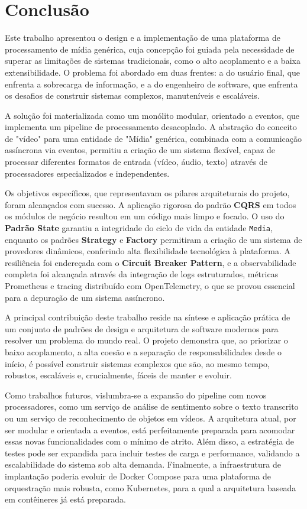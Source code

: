 \chapter{Conclusão}
\label{sec:conclusao}

Este trabalho apresentou o design e a implementação de uma plataforma de processamento de mídia genérica, cuja concepção foi guiada pela necessidade de superar as limitações de sistemas tradicionais, como o alto acoplamento e a baixa extensibilidade. O problema foi abordado em duas frentes: a do usuário final, que enfrenta a sobrecarga de informação, e a do engenheiro de software, que enfrenta os desafios de construir sistemas complexos, manuteníveis e escaláveis.

A solução foi materializada como um monólito modular, orientado a eventos, que implementa um pipeline de processamento desacoplado. A abstração do conceito de "vídeo" para uma entidade de "Mídia" genérica, combinada com a comunicação assíncrona via eventos, permitiu a criação de um sistema flexível, capaz de processar diferentes formatos de entrada (vídeo, áudio, texto) através de processadores especializados e independentes.

Os objetivos específicos, que representavam os pilares arquiteturais do projeto, foram alcançados com sucesso. A aplicação rigorosa do padrão \textbf{CQRS} em todos os módulos de negócio resultou em um código mais limpo e focado. O uso do \textbf{Padrão State} garantiu a integridade do ciclo de vida da entidade \texttt{Media}, enquanto os padrões \textbf{Strategy} e \textbf{Factory} permitiram a criação de um sistema de provedores dinâmicos, conferindo alta flexibilidade tecnológica à plataforma. A resiliência foi endereçada com o \textbf{Circuit Breaker Pattern}, e a observabilidade completa foi alcançada através da integração de logs estruturados, métricas Prometheus e tracing distribuído com OpenTelemetry, o que se provou essencial para a depuração de um sistema assíncrono.

A principal contribuição deste trabalho reside na síntese e aplicação prática de um conjunto de padrões de design e arquitetura de software modernos para resolver um problema do mundo real. O projeto demonstra que, ao priorizar o baixo acoplamento, a alta coesão e a separação de responsabilidades desde o início, é possível construir sistemas complexos que são, ao mesmo tempo, robustos, escaláveis e, crucialmente, fáceis de manter e evoluir.

Como trabalhos futuros, vislumbra-se a expansão do pipeline com novos processadores, como um serviço de análise de sentimento sobre o texto transcrito ou um serviço de reconhecimento de objetos em vídeos. A arquitetura atual, por ser modular e orientada a eventos, está perfeitamente preparada para acomodar essas novas funcionalidades com o mínimo de atrito. Além disso, a estratégia de testes pode ser expandida para incluir testes de carga e performance, validando a escalabilidade do sistema sob alta demanda. Finalmente, a infraestrutura de implantação poderia evoluir de Docker Compose para uma plataforma de orquestração mais robusta, como Kubernetes, para a qual a arquitetura baseada em contêineres já está preparada.
